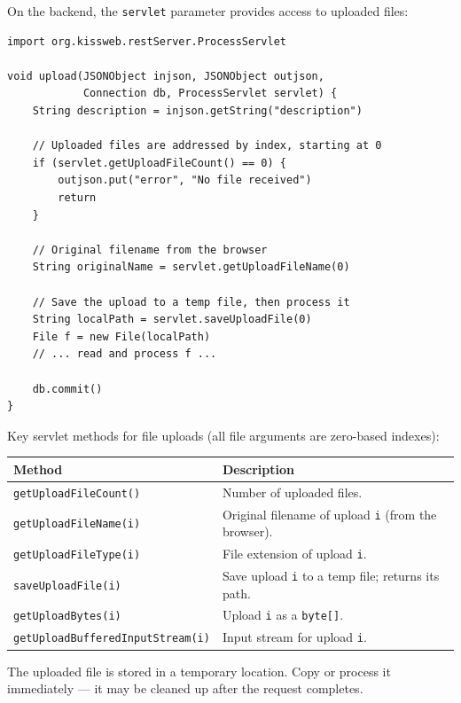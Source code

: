 On the backend, the \texttt{servlet} parameter provides access to uploaded files:

\begin{lstlisting}[style=groovy]
import org.kissweb.restServer.ProcessServlet

void upload(JSONObject injson, JSONObject outjson,
            Connection db, ProcessServlet servlet) {
    String description = injson.getString("description")

    // Uploaded files are addressed by index, starting at 0
    if (servlet.getUploadFileCount() == 0) {
        outjson.put("error", "No file received")
        return
    }

    // Original filename from the browser
    String originalName = servlet.getUploadFileName(0)

    // Save the upload to a temp file, then process it
    String localPath = servlet.saveUploadFile(0)
    File f = new File(localPath)
    // ... read and process f ...

    db.commit()
}
\end{lstlisting}

\noindent
Key servlet methods for file uploads (all file arguments are zero-based indexes):

\begin{longtable}{P{6.0cm}P{4.5cm}}
\toprule
\textbf{Method} & \textbf{Description} \\
\midrule
\endhead
\texttt{getUploadFileCount()} & Number of uploaded files. \\
\texttt{getUploadFileName(i)} & Original filename of upload \texttt{i} (from the browser). \\
\texttt{getUploadFileType(i)} & File extension of upload \texttt{i}. \\
\texttt{saveUploadFile(i)} & Save upload \texttt{i} to a temp file; returns its path. \\
\texttt{getUploadBytes(i)} & Upload \texttt{i} as a \texttt{byte[]}. \\
\texttt{getUploadBufferedInputStream(\allowbreak i)} & Input stream for upload \texttt{i}. \\
\bottomrule
\end{longtable}

\begin{tipbox}
The uploaded file is stored in a temporary location.  Copy or process it immediately --- it may be cleaned up after the request completes.
\end{tipbox}

